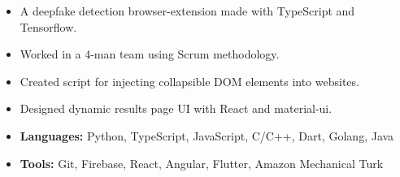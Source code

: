 
\begin{itemize}
\item A deepfake detection browser-extension made with TypeScript and Tensorflow.
\item Worked in a 4-man team using Scrum methodology.
\item Created script for injecting collapsible DOM elements into websites.
\item Designed dynamic results page UI with React and material-ui.
\end{itemize}





\begin{itemize}
    \item \textbf{Languages:} Python, TypeScript, JavaScript, C/C++, Dart, Golang, Java
    \item \textbf{Tools:} Git, Firebase, React, Angular, Flutter, Amazon Mechanical Turk
\end{itemize}